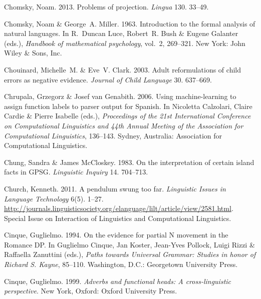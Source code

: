 \begin{thebibliography}{1420}
Chomsky, Noam. 2013.
\newblock Problems of projection.
\newblock \emph{Lingua} 130. 33--49.

Chomsky, Noam \& George~A. Miller. 1963.
\newblock Introduction to the formal analysis of natural languages.
\newblock In R.~Duncan Luce, Robert~R. Bush \& Eugene Galanter (eds.),
  \emph{Handbook of mathematical psychology}, vol.~2, 269--321. New York: John
  Wiley \& Sons, Inc.

Chouinard, Michelle~M. \& Eve~V. Clark. 2003.
\newblock Adult reformulations of child errors as negative evidence.
\newblock \emph{Journal of Child Language} 30. 637--669.

Chrupala, Grzegorz \& Josef van Genabith. 2006.
\newblock Using machine-learning to assign function labels to parser output for
  {Spanish}.
\newblock In Nicoletta Calzolari, Claire Cardie \& Pierre Isabelle (eds.),
  \emph{Proceedings of the {21st International Conference on Computational
  Linguistics and 44th Annual Meeting of the Association for Computational
  Linguistics}}, 136--143. Sydney, Australia: Association for Computational
  Linguistics.

Chung, Sandra \& James McCloskey. 1983.
\newblock On the interpretation of certain island facts in {GPSG}.
\newblock \emph{Linguistic Inquiry} 14. 704--713.

Church, Kenneth. 2011.
\newblock A pendulum swung too far.
\newblock \emph{Linguistic Issues in Language Technology} 6(5). 1--27.
\newblock
  \urlprefix\url{http://journals.linguisticsociety.org/elanguage/lilt/article/view/2581.html}.
\newblock Special Issue on Interaction of Linguistics and Computational
  Linguistics.

Cinque, Guglielmo. 1994.
\newblock On the evidence for partial {N} movement in the {Romance DP}.
\newblock In Guglielmo Cinque, Jan Koster, Jean-Yves Pollock, Luigi Rizzi \&
  Raffaella Zanuttini (eds.), \emph{Paths towards {Universal Grammar}:
  {Studies} in honor of {Richard S. Kayne}}, 85--110. Washington, D.C.:
  Georgetown University Press.

Cinque, Guglielmo. 1999.
\newblock \emph{Adverbs and functional heads: {A} cross-linguistic
  perspective}.
\newblock New York, Oxford: Oxford University Press.


\end{thebibliography}

